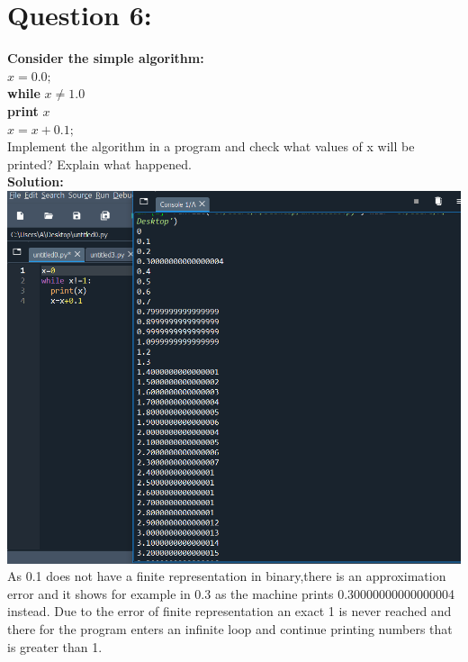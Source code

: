 \documentclass[a4paper,12pt]{article}
\begin{document}
\section*{\LARGE Question 6:}
\textbf{Consider the simple algorithm:\\}
$x = 0.0;$\\
\textbf{while} $x \neq 1.0$\\
\indent \textbf{print} $x$\\
\indent $x = x +0.1;$\\
Implement the algorithm in a program and check what values of x will be printed?
Explain what happened.\\[0.5cm]
 {\color{blue}\textbf{Solution:\\[0.2cm]}}
 \includegraphics[width=20cm]{Q6.png}
 As 0.1 does not have a finite representation in binary,there is an approximation error and it shows for example in 0.3 as the machine prints 0.30000000000000004 instead. Due to the error of finite representation an exact 1 is never reached and there for the program enters an infinite loop and continue printing numbers that is greater than 1.
\newpage
\end{document}
